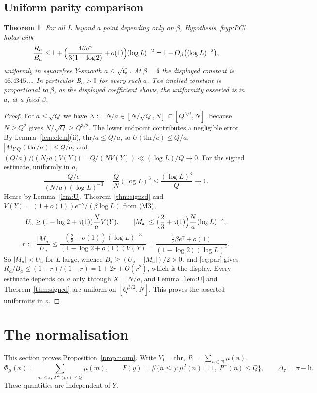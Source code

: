 \documentclass[11pt,a4paper]{article}
\theoremstyle{plain}
\newtheorem{theorem}{Theorem}
\theoremstyle{definition}
\theoremstyle{remark}
\newcommand{\Pp}{P^{+}}
\newcommand{\thr}{\mathrm{thr}}
\newcommand{\li}{\mathrm{li}}
\newcommand{\band}{\mathcal{B}}
\begin{document}
\subsection{Uniform parity comparison}\label{sec:PCproof}

\begin{theorem}\label{thm:PC}
For all $L$ beyond a point depending only on $\beta$, Hypothesis~\ref{hyp:PC} holds with
\[
  \frac{R_{a}}{B_{a}}\le1+\Bigl(\frac{4\beta e^{\gamma}}{3(1-\log2)}+o(1)\Bigr)(\log L)^{-2}
  =1+O_{\beta}\bigl((\log L)^{-2}\bigr),
\]
uniformly in squarefree $Y$-smooth $a\le\sqrt Q$. At $\beta=6$ the displayed constant is
$46.4345\ldots$. In particular $B_{a}>0$ for every such $a$. The implied constant is proportional to
$\beta$, as the displayed coefficient shows; the uniformity asserted is in $a$, at a fixed $\beta$.
\end{theorem}

\begin{proof}
For $a\le\sqrt Q$ we have $X:=N/a\in[N/\sqrt Q,N]\subseteq[Q^{3/2},N]$, because $N\ge Q^{2}$ gives
$N/\sqrt Q\ge Q^{3/2}$. The lower endpoint contributes a negligible error. By Lemma~\ref{lem:elem}(ii),
$\thr/a\le Q/a$, so $U(\thr/a)\le Q/a$, $|M_{Y,Q}(\thr/a)|\le Q/a$, and
$(Q/a)/\bigl((N/a)V(Y)\bigr)=Q/(NV(Y))\ll(\log L)/Q\to0$.
For the signed estimate, uniformly in $a$,
\[
  \frac{Q/a}{(N/a)(\log L)^{-3}}
  =\frac QN(\log L)^3
  \le\frac{(\log L)^3}{Q}\longrightarrow0.
\]
Hence by Lemma~\ref{lem:U},
Theorem~\ref{thm:signed} and $V(Y)=(1+o(1))e^{-\gamma}/(\beta\log L)$ from (M3),
\[
  U_{a}\ge(1-\log2+o(1))\frac NaV(Y),\qquad
  |M_{a}|\le\Bigl(\frac23+o(1)\Bigr)\frac Na(\log L)^{-3},
\]
\[
  r:=\frac{|M_{a}|}{U_{a}}\le\frac{(\frac23+o(1))(\log L)^{-3}}{(1-\log2+o(1))V(Y)}
  =\frac{\frac23\beta e^{\gamma}+o(1)}{(1-\log2)(\log L)^{2}} .
\]
So $|M_{a}|<U_{a}$ for $L$ large, whence $B_{a}\ge(U_{a}-|M_{a}|)/2>0$, and \eqref{eq:par} gives
$R_{a}/B_{a}\le(1+r)/(1-r)=1+2r+O(r^{2})$, which is the display. Every estimate depends on $a$ only
through $X=N/a$, and Lemma~\ref{lem:U} and Theorem~\ref{thm:signed} are uniform on $[Q^{3/2},N]$.
This proves the asserted uniformity in $a$.
\end{proof}

\section{The normalisation}\label{sec:norm}

This section proves Proposition~\ref{prop:norm}. Write $Y_{1}=\thr$, $P_{1}=\sum_{n\in\band}\mu(n)$,
\[
  \Phi_{\mu}(x)=\!\!\sum_{m\le x,\ \Pp(m)\le Q}\!\!\mu(m),\qquad
  F(y)=\#\{n\le y:\mu^{2}(n)=1,\ \Pp(n)\le Q\},\qquad \Delta_{\pi}=\pi-\li .
\]
These quantities are independent of $Y$.
\end{document}
